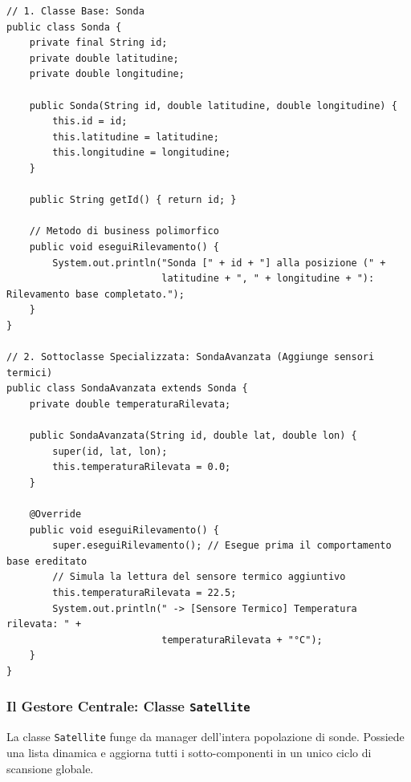\documentclass[12pt, a4paper]{article}
\begin{document}
\begin{verbatim}
// 1. Classe Base: Sonda
public class Sonda {
    private final String id;
    private double latitudine;
    private double longitudine;

    public Sonda(String id, double latitudine, double longitudine) {
        this.id = id;
        this.latitudine = latitudine;
        this.longitudine = longitudine;
    }

    public String getId() { return id; }

    // Metodo di business polimorfico
    public void eseguiRilevamento() {
        System.out.println("Sonda [" + id + "] alla posizione (" + 
                           latitudine + ", " + longitudine + "): Rilevamento base completato.");
    }
}

// 2. Sottoclasse Specializzata: SondaAvanzata (Aggiunge sensori termici)
public class SondaAvanzata extends Sonda {
    private double temperaturaRilevata;

    public SondaAvanzata(String id, double lat, double lon) {
        super(id, lat, lon);
        this.temperaturaRilevata = 0.0;
    }

    @Override
    public void eseguiRilevamento() {
        super.eseguiRilevamento(); // Esegue prima il comportamento base ereditato
        // Simula la lettura del sensore termico aggiuntivo
        this.temperaturaRilevata = 22.5; 
        System.out.println(" -> [Sensore Termico] Temperatura rilevata: " + 
                           temperaturaRilevata + "°C");
    }
}
\end{verbatim}

\newpage

\subsubsection{Il Gestore Centrale: Classe \texttt{Satellite}}
La classe \texttt{Satellite} funge da manager dell'intera popolazione di sonde. Possiede una lista dinamica e aggiorna tutti i sotto-componenti in un unico ciclo di scansione globale.
\end{document}
